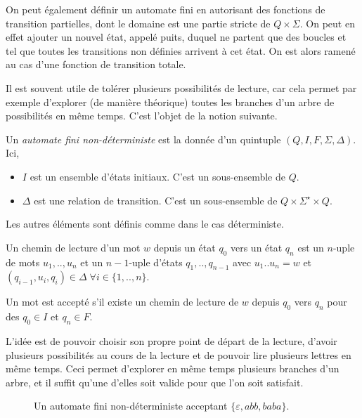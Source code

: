 \begin{rem}
On peut également définir un automate fini en autorisant des fonctions de transition partielles, dont le domaine est une partie stricte de $Q\times\Sigma$. On peut en effet ajouter un nouvel état, appelé puits, duquel ne partent que des boucles et tel que toutes les transitions non définies arrivent à cet état. On est alors ramené au cas d'une fonction de transition totale.
\end{rem}

Il est souvent utile de tolérer plusieurs possibilités de lecture, car cela permet par exemple d'explorer (de manière théorique) toutes les branches d'un arbre de possibilités en même temps. C'est l'objet de la notion suivante.

\begin{dfn}
Un \emph{automate fini non-déterministe} est la donnée d'un quintuple $(Q,I,F,\Sigma,\Delta)$. Ici,
\begin{itemize}
\item $I$ est un ensemble d'états initiaux. C'est un sous-ensemble de $Q$.
\item $\Delta$ est une relation de transition. C'est un sous-ensemble de $Q\times \Sigma^\star\times Q$.
\end{itemize}
Les autres éléments sont définis comme dans le cas déterministe.

Un chemin de lecture d'un mot $w$ depuis un état $q_0$ vers un état $q_n$ est un $n$-uple de mots $u_1,..,u_n$ et un $n-1$-uple d'états $q_1,..,q_{n-1}$ avec $u_1..u_n=w$ et $(q_{i-1},u_i,q_i)\in\Delta\;\forall i\in \{1,..,n\}$.

Un mot est accepté s'il existe un chemin de lecture de $w$ depuis $q_0$ vers $q_n$ pour des $q_0\in I$ et $q_n\in F$.
\end{dfn}

L'idée est de pouvoir choisir son propre point de départ de la lecture, d'avoir plusieurs possibilités au cours de la lecture et de pouvoir lire plusieurs lettres en même temps. Ceci permet d'explorer en même temps plusieurs branches d'un arbre, et il suffit qu'une d'elles soit valide pour que l'on soit satisfait.

\begin{figure}
\centering
{}
\caption{Un automate fini non-déterministe acceptant $\{\varepsilon,abb,baba\}$.}
\label{sk:fig:nfa1}
\end{figure}

